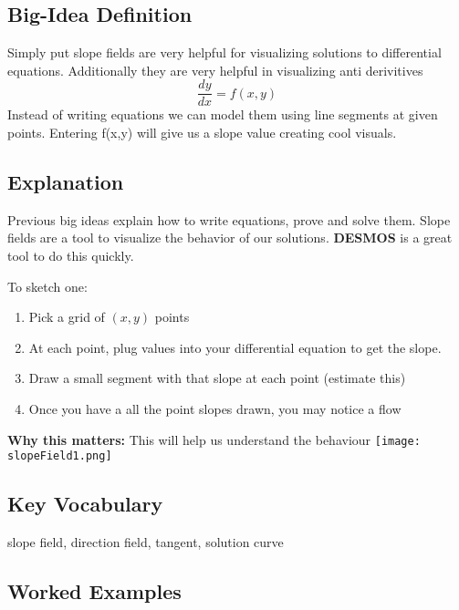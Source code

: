 \documentclass{article}
\begin{document}
\subsection*{Big-Idea Definition}
Simply put slope fields are very helpful for visualizing solutions to differential equations.
Additionally they are very helpful in visualizing anti derivitives
\[
\frac{dy}{dx} = f(x, y)
\]
Instead of writing equations we can model them using line segments at given points. Entering f(x,y) will give us a slope value creating cool visuals. 

\subsection*{Explanation}
Previous big ideas explain how to write equations, prove and solve them.
Slope fields are a tool to visualize the behavior of our solutions. 
\textbf{DESMOS} is a great tool to do this quickly. 

To sketch one:
\begin{enumerate}
  \item Pick a grid of \((x, y)\) points
  \item At each point, plug values into your differential equation to get the slope.
  \item Draw a small segment with that slope at each point (estimate this)
  \item Once you have a all the point slopes drawn, you may notice a flow
\end{enumerate}

\textbf{Why this matters:} This will help us understand the behaviour
\centering
\texttt{[image: slopeField1.png]}
\label{fig:enter-label}

\subsection*{Key Vocabulary}
slope field, direction field, tangent, solution curve

\subsection*{Worked Examples}
\end{document}
